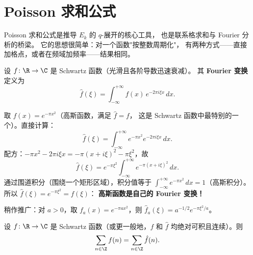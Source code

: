 


\section{Poisson 求和公式}
\label{sec:poisson-summation}

Poisson 求和公式是推导 $E_k$ 的 $q$-展开的核心工具，
也是联系格求和与 Fourier 分析的桥梁。
它的思想很简单：对一个函数"按整数周期化"，
有两种方式——直接加格点，或者在频域加频率——结果相同。

\begin{definition}[Fourier 变换]
\label{def:fourier-transform}
设 $f\colon \R \to \C$ 是 Schwartz 函数（光滑且各阶导数迅速衰减）。
其 \textbf{Fourier 变换}定义为
\[
  \hat{f}(\xi) = \int_{-\infty}^{+\infty} f(x)\, e^{-2\pi i \xi x}\, dx.
\]
\end{definition}

\begin{example}
\label{ex:gaussian-fourier}
取 $f(x) = e^{-\pi x^2}$（高斯函数，满足 $\hat{f} = f$，
这是 Schwartz 函数中最特别的一个）。直接计算：
\[
  \hat{f}(\xi)
  = \int_{-\infty}^{+\infty} e^{-\pi x^2} e^{-2\pi i \xi x}\, dx.
\]
配方：$-\pi x^2 - 2\pi i \xi x = -\pi(x + i\xi)^2 - \pi\xi^2$，故
\[
  \hat{f}(\xi) = e^{-\pi \xi^2} \int_{-\infty}^{+\infty} e^{-\pi(x+i\xi)^2}\, dx.
\]
通过围道积分（围绕一个矩形区域），积分值等于
$\int_{-\infty}^{+\infty} e^{-\pi x^2}\, dx = 1$（高斯积分）。
所以 $\hat{f}(\xi) = e^{-\pi\xi^2} = f(\xi)$：
\textbf{高斯函数是自己的 Fourier 变换！}

稍作推广：对 $a > 0$，取 $f_a(x) = e^{-\pi a x^2}$，则
$\hat{f}_a(\xi) = a^{-1/2} e^{-\pi \xi^2/a}$。
\end{example}

\begin{theorem}
\label{thm:poisson-summation}
设 $f\colon \R \to \C$ 是 Schwartz 函数（或更一般地，$f$ 和 $\hat{f}$ 均绝对可积且连续）。则
\[
  \sum_{n \in \Z} f(n) = \sum_{n \in \Z} \hat{f}(n).
\]
\end{theorem}



